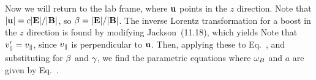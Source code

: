 {	Now we will return to the lab frame, where $\vb{u}$ points in the $z$ direction.  Note that $\abs{\vb{u}} = c \abs{\vb{E}} / \abs{\vb{B}}$, so $\beta = \abs{\vb{E}} / \abs{\vb{B}}$.  The inverse Lorentz transformation for a boost in the $z$ direction is found by modifying Jackson~(11.18), which yields
	Note that $v_\parallel' = v_\parallel$, since $v_\parallel$ is perpendicular to $\vb{u}$.  Then, applying these to Eq.~, and substituting for $\beta$ and $\gamma$, we find the parametric equations
	{\color{blue} }
	where $\omega_B$ and $a$ are given by Eq.~.
}

%
%


